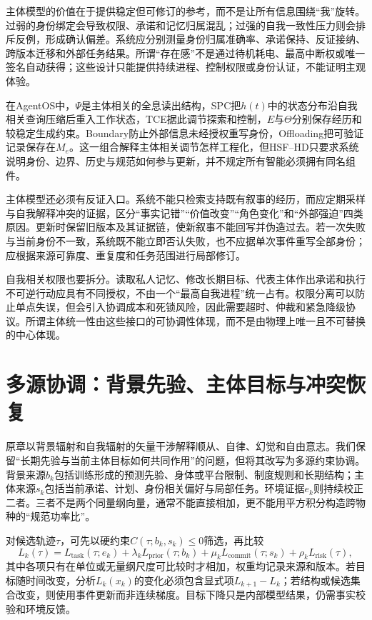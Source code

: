 主体模型的价值在于提供稳定但可修订的参考，而不是让所有信息围绕“我”旋转。过弱的身份绑定会导致权限、承诺和记忆归属混乱；过强的自我一致性压力则会排斥反例，形成确认偏差。系统应分别测量身份归属准确率、承诺保持、反证接纳、跨版本迁移和外部任务结果。所谓“存在感”不是通过待机耗电、最高中断权或唯一签名自动获得；这些设计只能提供持续进程、控制权限或身份认证，不能证明主观体验。

在AgentOS中，$\Psi$是主体相关的全息读出结构，SPC把$h(t)$中的状态分布沿自我相关查询压缩后重入工作状态，TCE据此调节探索和控制，$E$与$\Theta$分别保存经历和较稳定生成约束。Boundary防止外部信息未经授权重写身份，Offloading把可验证记录保存在$M_e$。这一组合解释主体相关调节怎样工程化，但HSF--HD只要求系统说明身份、边界、历史与规范如何参与更新，并不规定所有智能必须拥有同名组件。

主体模型还必须有反证入口。系统不能只检索支持既有叙事的经历，而应定期采样与自我解释冲突的证据，区分“事实记错”“价值改变”“角色变化”和“外部强迫”四类原因。更新时保留旧版本及其证据链，使新叙事不能回写并伪造过去。若一次失败与当前身份不一致，系统既不能立即否认失败，也不应据单次事件重写全部身份；应根据来源可靠度、重复度和任务范围进行局部修订。

自我相关权限也要拆分。读取私人记忆、修改长期目标、代表主体作出承诺和执行不可逆行动应具有不同授权，不由一个“最高自我进程”统一占有。权限分离可以防止单点失误，但会引入协调成本和死锁风险，因此需要超时、仲裁和紧急降级协议。所谓主体统一性由这些接口的可协调性体现，而不是由物理上唯一且不可替换的中心体现。

\section{多源协调：背景先验、主体目标与冲突恢复}
\label{sec:dual_source_interference}

原章以背景辐射和自我辐射的矢量干涉解释顺从、自律、幻觉和自由意志。我们保留“长期先验与当前主体目标如何共同作用”的问题，但将其改写为多源约束协调。背景来源$b_k$包括训练形成的预测先验、身体或平台限制、制度规则和长期结构；主体来源$s_k$包括当前承诺、计划、身份相关偏好与局部任务。环境证据$e_k$则持续校正二者。三者不是两个同量纲向量，通常不能直接相加，更不能用平方积分构造跨物种的“规范功率比”。

对候选轨迹$\tau$，可先以硬约束$C(\tau;b_k,s_k)\le0$筛选，再比较
\[
L_k(\tau)=L_{\mathrm{task}}(\tau;e_k)+\lambda_k L_{\mathrm{prior}}(\tau;b_k)
+\mu_k L_{\mathrm{commit}}(\tau;s_k)+\rho_k L_{\mathrm{risk}}(\tau),
\]
其中各项只有在单位或无量纲尺度可比较时才相加，权重均记录来源和版本。若目标随时间改变，分析$L_k(x_k)$的变化必须包含显式项$L_{k+1}-L_k$；若结构或候选集合改变，则使用事件更新而非连续梯度。目标下降只是内部模型结果，仍需事实校验和环境反馈。

